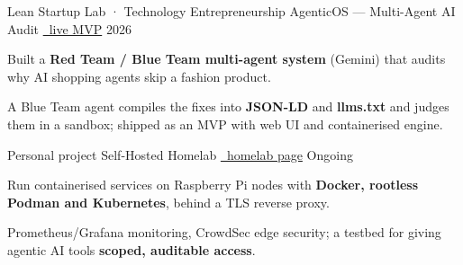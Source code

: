 \documentclass[11pt, a4paper]{../awesome-cv}
\begin{document}
\begin{cventries}
  \cventry
    {Lean Startup Lab · Technology Entrepreneurship}
    {AgenticOS — Multi-Agent AI Audit}
    {\href{https://agenticos-mvp.netlify.app}{\faGlobe\ live MVP}}
    {2026}
    {
      \begin{cvitems}
        \item {Built a \textbf{Red Team / Blue Team multi-agent system} (Gemini) that audits why AI shopping agents skip a fashion product.}
        \item {A Blue Team agent compiles the fixes into \textbf{JSON-LD} and \textbf{llms.txt} and judges them in a sandbox; shipped as an MVP with web UI and containerised engine.}
      \end{cvitems}
    }

  \cventry
    {Personal project}
    {Self-Hosted Homelab}
    {\href{https://mattia-giovannini.github.io/homelab/}{\faGlobe\ homelab page}}
    {Ongoing}
    {
      \begin{cvitems}
        \item {Run containerised services on Raspberry Pi nodes with \textbf{Docker, rootless Podman and Kubernetes}, behind a TLS reverse proxy.}
        \item {Prometheus/Grafana monitoring, CrowdSec edge security; a testbed for giving agentic AI tools \textbf{scoped, auditable access}.}
      \end{cvitems}
    }
\end{cventries}

\begin{cvskills}
\end{cvskills}

\begin{cvskills}
\end{cvskills}
\end{document}

